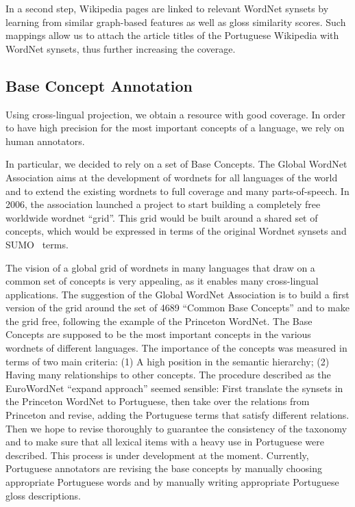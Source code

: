 \documentclass[a4paper,twocolumn]{article}
\begin{document}
In a second step, Wikipedia pages are linked to relevant WordNet
synsets by learning from similar graph-based features as well as gloss
similarity scores.  Such mappings allow us to attach the article
titles of the Portuguese Wikipedia with WordNet synsets, thus further
increasing the coverage.


\subsection{Base Concept Annotation}

Using cross-lingual projection, we obtain a resource with good
coverage.  In order to have high precision for the most important
concepts of a language, we rely on human annotators.

In particular, we decided to rely on a set of Base Concepts.  The
Global WordNet Association aims at the development of wordnets for all
languages of the world and to extend the existing wordnets to full
coverage and many parts-of-speech. In 2006, the association launched a
project to start building a completely free worldwide wordnet
``grid''. This grid would be built around a shared set of concepts,
which would be expressed in terms of the original Wordnet synsets and
SUMO~\cite{niles2001towards} terms.

The vision of a global grid of wordnets in many languages that draw on
a common set of concepts is very appealing, as it enables many
cross-lingual applications.  The suggestion of the Global WordNet
Association is to build a first version of the grid around the set of
4689 ``Common Base Concepts'' and to make the grid free, following the
example of the Princeton WordNet. The Base Concepts are supposed to be
the most important concepts in the various wordnets of different
languages. The importance of the concepts was measured in terms of two
main criteria: (1) A high position in the semantic hierarchy; (2)
Having many relationships to other concepts.  The procedure described
as the EuroWordNet ``expand approach'' seemed sensible: First
translate the synsets in the Princeton WordNet to Portuguese, then
take over the relations from Princeton and revise, adding the
Portuguese terms that satisfy different relations. Then we hope to
revise thoroughly to guarantee the consistency of the taxonomy and to
make sure that all lexical items with a heavy use in Portuguese were
described. This process is under development at the moment. Currently,
Portuguese annotators are revising the base concepts by manually
choosing appropriate Portuguese words and by manually writing
appropriate Portuguese gloss descriptions.
\end{document}
